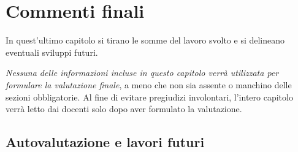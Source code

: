 \documentclass[a4paper,12pt]{report}
\begin{document}
\chapter{Commenti finali}

In quest'ultimo capitolo si tirano le somme del lavoro svolto e si delineano eventuali sviluppi
futuri.

\textit{Nessuna delle informazioni incluse in questo capitolo verrà utilizzata per formulare la valutazione finale}, a meno che non sia assente o manchino delle sezioni obbligatorie.
%
Al fine di evitare pregiudizi involontari, l'intero capitolo verrà letto dai docenti solo dopo aver formulato la valutazione.

\section{Autovalutazione e lavori futuri}
\end{document}
